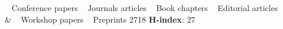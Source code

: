 \documentclass[localFont,alternative]{documentMETADATA}
\def\citNo{2718}
\def\hIndex{27}
\begin{document}
\begin{keywords}
{			 \faAngleRight~  Conference papers
\hspace{4pt} \faAngleRight~  Journals articles
\hspace{4pt} \faAngleRight~  Book chapters
\hspace{4pt} \faAngleRight~  Editorial articles
		 \\& \faAngleRight~  Workshop papers
\hspace{4pt} \faAngleRight~  Preprints
}
{\citNo \hspace{8pt} 
 \textbf{H-index}: \hIndex \hspace{8pt} 
 }%
\end{keywords}
\end{document}
